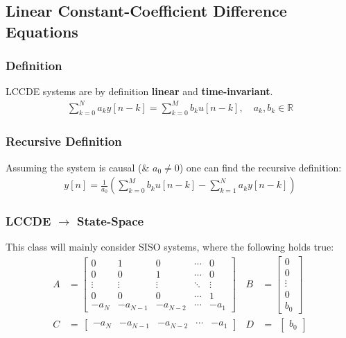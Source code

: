 \subsection{Linear Constant-Coefficient Difference Equations}
    \subsubsection{Definition}
        LCCDE systems are by definition \textbf{linear} and \textbf{time-invariant}.
        \begin{align*}
            \sum\limits_{k=0}^N a_ky[n-k] = \sum\limits_{k=0}^M b_k u[n-k], \quad a_k, b_k \in \mathbb{R}
        \end{align*}

    \subsubsection{Recursive Definition}
        Assuming the system is causal (\& $a_0 \neq 0$) one can find the recursive definition:
        \begin{align*}
            y[n] = \frac{1}{a_0} \left(\sum\limits_{k=0}^M b_ku[n-k] - \sum\limits_{k=1}^N a_k y[n-k]\right)
        \end{align*}

    \subsubsection{LCCDE \texorpdfstring{$\rightarrow$}{<->} State-Space}
        This class will mainly consider SISO systems, where the following holds true:
        \begin{align*}
            A &=\begin{bmatrix}
                    0 & 1 & 0 & \cdots & 0 \\ 0 & 0 & 1 & \cdots & 0 \\ \vdots & \vdots & \vdots & \ddots & \vdots \\ 0 & 0 & 0 & \cdots & 1 \\ -a_N & -a_{N-1} & -a_{N-2} & \cdots & -a_1
                \end{bmatrix}  
            &B&=\begin{bmatrix} 
                    0 \\ 0 \\ \vdots \\ 0 \\ b_0 
                \end{bmatrix}\\
            C &=\,
                \begin{bmatrix}
                    -a_N & -a_{N-1} & -a_{N-2} & \cdots & -a_1 
                \end{bmatrix}
            & D&= \phantom{:}
                \begin{bmatrix}
                    b_0
                \end{bmatrix}
        \end{align*}

